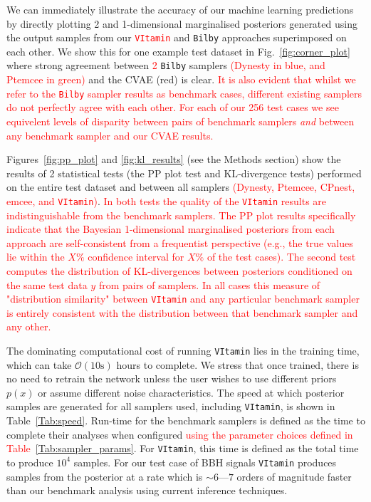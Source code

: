 \documentclass[%
showpacs,
nofootinbib,
 amsmath,amssymb,
 aps,
 twocolumn,
 prl,
 reprint,
floatfix,
]{revtex4-1}
\newcommand{\new}[1]{\textcolor{red}{#1}}
\begin{document}
%
%
We can immediately illustrate the accuracy of our machine learning predictions
by directly plotting 2 and 1-dimensional marginalised posteriors generated
using the output samples from our \new{\texttt{VItamin}} and \texttt{Bilby}
approaches superimposed on each other. We show this for one example test
dataset in Fig.~\ref{fig:corner_plot} where strong agreement between \new{2}
\texttt{Bilby} samplers \new{(Dynesty in blue, and Ptemcee in green)} and the
\ac{CVAE} (red) is clear. \new{It is also evident that whilst we refer to the
\texttt{Bilby} sampler results as benchmark cases, different existing samplers
do not perfectly agree with each other. For each of our 256 test cases we see
equivelent levels of disparity between pairs of benchmark samplers \emph{and}
between any benchmark sampler and our \ac{CVAE} results.}  

%
%
Figures~\ref{fig:pp_plot} and \ref{fig:kl_results} (see the Methods section)
show the results of 2 statistical tests (the \ac{PP} plot test and
\ac{KL}-divergence tests) performed on the entire test dataset and between all
samplers \new{(Dynesty, Ptemcee, CPnest, emcee, and \texttt{VItamin})}. \new{In
both tests the quality of the \new{\texttt{VItamin}} results are indistinguishable from the
benchmark samplers. The \ac{PP} plot results specifically indicate that the
Bayesian 1-dimensional marginalised posteriors from each approach are
self-consistent from a frequentist perspective (e.g., the true values lie
within the $X\%$ confidence interval for $X\%$ of the test cases). The second
test computes the distribution of \ac{KL}-divergences between posteriors
conditioned on the same test data $y$ from pairs of samplers. In all cases this
measure of "distribution similarity" between \texttt{VItamin} and any particular
benchmark sampler is entirely consistent with the distribution between that
benchmark sampler and any other.}   

%
%
The dominating computational cost of running \texttt{VItamin} lies in the
training time, which can take $\mathcal{O}(10\text{s})$ hours to complete. We
stress that once trained, there is no need to retrain the network unless the
user wishes to use different priors $p(x)$ or assume different noise
characteristics. The speed at which posterior samples are generated for all
samplers used, including \texttt{VItamin}, is shown in Table~\ref{Tab:speed}.
Run-time for the benchmark samplers is defined as the time to complete their
analyses when configured \new{using the parameter choices defined in
Table~\ref{Tab:sampler_params}}. For \texttt{VItamin}, this time is defined as
the total time to produce $10^4$ samples. For our test case of \ac{BBH} signals
\texttt{VItamin} produces samples from the posterior at a rate which is $\sim
6$---$7$ orders of magnitude faster than our benchmark analysis using current
inference techniques. 
\end{document}
